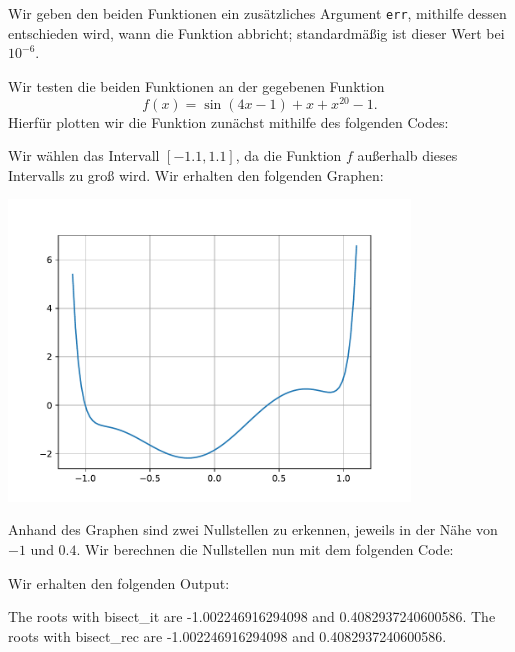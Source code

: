 \section{}

Wir geben den beiden Funktionen ein zusätzliches Argument \texttt{err}, mithilfe dessen entschieden wird, wann die Funktion abbricht; standardmäßig ist dieser Wert bei $10^{-6}$.



Wir testen die beiden Funktionen an der gegebenen Funktion
\[
    f(x)
  = \sin(4x - 1) + x + x^{20} - 1.
\]
Hierfür plotten wir die Funktion zunächst mithilfe des folgenden Codes:



Wir wählen das Intervall $[-1.1, 1.1]$, da die Funktion $f$ außerhalb dieses Intervalls zu groß wird.
Wir erhalten den folgenden Graphen:

\begin{center}
  \includegraphics[width = 0.8\textwidth]{chapter_04/exercise_04_13_figure.pdf}
\end{center}

Anhand des Graphen sind zwei Nullstellen zu erkennen, jeweils in der Nähe von $-1$ und $0.4$.
Wir berechnen die Nullstellen nun mit dem folgenden Code:
  


Wir erhalten den folgenden Output:

\begin{consoleoutput}
The roots with bisect_it are -1.002246916294098 and 0.4082937240600586.
The roots with bisect_rec are -1.002246916294098 and 0.4082937240600586.
\end{consoleoutput}
